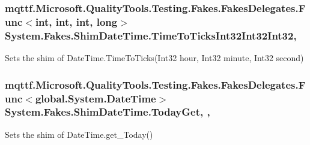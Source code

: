 \hypertarget{class_system_1_1_fakes_1_1_shim_date_time_a0cd759e46b67edfb3716da00c3736c03}{
\subsubsection[{Time\-To\-Ticks\-Int32\-Int32\-Int32}]{\setlength{\rightskip}{0pt plus 5cm}mqttf.\-Microsoft.\-Quality\-Tools.\-Testing.\-Fakes.\-Fakes\-Delegates.\-Func$<$int, int, int, long$>$ System.\-Fakes.\-Shim\-Date\-Time.\-Time\-To\-Ticks\-Int32\-Int32\-Int32\hspace{0.3cm}{\ttfamily [static]}, {\ttfamily [set]}}}\label{class_system_1_1_fakes_1_1_shim_date_time_a0cd759e46b67edfb3716da00c3736c03}


Sets the shim of Date\-Time.\-Time\-To\-Ticks(\-Int32 hour, Int32 minute, Int32 second)

\hypertarget{class_system_1_1_fakes_1_1_shim_date_time_a45249fea7d16d2b2859b7efebf92fc90}{
\subsubsection[{Today\-Get}]{\setlength{\rightskip}{0pt plus 5cm}mqttf.\-Microsoft.\-Quality\-Tools.\-Testing.\-Fakes.\-Fakes\-Delegates.\-Func$<$global.\-System.\-Date\-Time$>$ System.\-Fakes.\-Shim\-Date\-Time.\-Today\-Get\hspace{0.3cm}{\ttfamily [static]}, {\ttfamily [get]}, {\ttfamily [set]}}}\label{class_system_1_1_fakes_1_1_shim_date_time_a45249fea7d16d2b2859b7efebf92fc90}


Sets the shim of Date\-Time.\-get\-\_\-\-Today()

